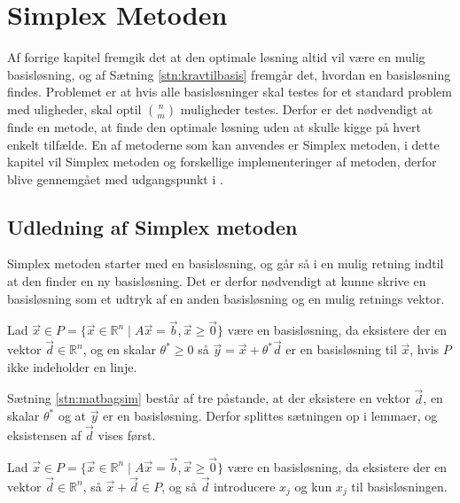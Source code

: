 \chapter{Simplex Metoden}
Af forrige kapitel fremgik det at den optimale løsning altid vil være en mulig basisløsning, og af Sætning \ref{stn:kravtilbasis}
fremgår det, hvordan en basisløsning findes. 
Problemet er at hvis alle basisløsninger skal testes for et standard problem med uligheder, skal optil $\binom{n}{m}$ muligheder testes. 
Derfor er det nødvendigt at finde en metode, at finde den optimale løsning uden at skulle kigge på hvert enkelt tilfælde. 
En af metoderne som kan anvendes er Simplex metoden, i dette kapitel vil Simplex metoden og forskellige implementeringer af metoden, derfor blive gennemgået med udgangspunkt i .
\section{Udledning af Simplex metoden}
Simplex metoden starter med en basisløsning, og går så i en mulig retning indtil at den finder en ny basisløsning.
Det er derfor nødvendigt at kunne skrive en basisløsning som et udtryk af en anden basisløsning og en mulig retnings vektor.
\begin{stn}
Lad $\vec{x} \in P =\{\vec{x}\in \mathds{R}^n \mid A\vec{x}= \vec{b}, \vec{x}\geq \vec{0}\}$ være en basisløsning, da eksistere der en vektor $\vec{d}\in \mathds{R}^n$, og en skalar $\theta^*\geq 0$ så $\vec{y}= \vec{x} + \theta^* \vec{d}$ er en basisløsning til $\vec{x}$, hvis $P$ ikke indeholder en linje.
\label{stn:matbagsim}
\end{stn}
Sætning \ref{stn:matbagsim} består af tre påstande, at der eksistere en vektor $\vec{d}$, en skalar $\theta^*$ og at $\vec{y}$ er en basisløsning.
Derfor splittes sætningen op i lemmaer, og eksistensen af $\vec{d}$ vises først.
\begin{lma}
Lad $\vec{x} \in P =\{\vec{x}\in \mathds{R}^n \mid A\vec{x}= \vec{b}, \vec{x}\geq \vec{0}\}$ være en basisløsning, da eksistere der en vektor $\vec{d}\in \mathds{R}^n$, så $\vec{x} + \vec{d} \in P$, og så $\vec{d}$ introducere $x_j$ og kun $x_j$ til basisløsningen.
\label{lma:retningsvektor}
\end{lma}
